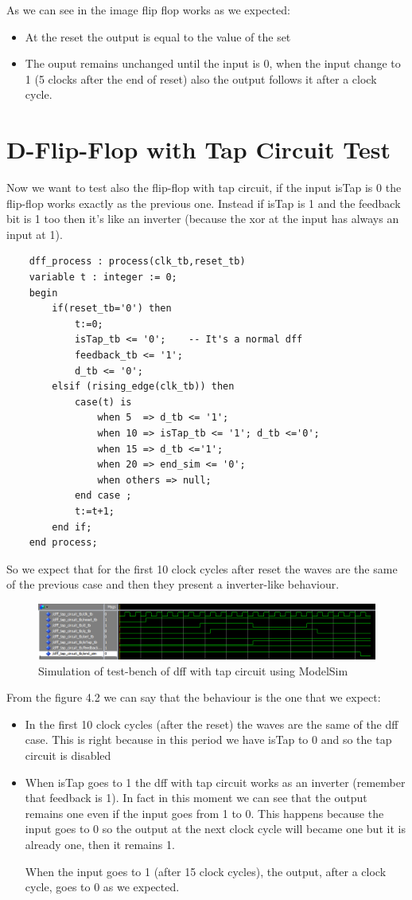 \documentclass[a4paper]{report}
\begin{document}
\noindent As we can see in the image flip flop works as we expected:
\begin{itemize}
	\item At the reset the output is equal to the value of the set
	\item The ouput remains unchanged until the input is 0, when the input change to 1 (5 clocks after the end of reset) also the output follows it after a clock cycle.
\end{itemize}

\section{D-Flip-Flop with Tap Circuit Test}
Now we want to test also the flip-flop with tap circuit, if the input isTap is 0 the flip-flop works exactly as the previous one. Instead if isTap is 1 and the feedback bit is 1 too then it's like an inverter (because the xor at the input has always an input at 1).
\begin{lstlisting}
	dff_process : process(clk_tb,reset_tb)
	variable t : integer := 0;
	begin
		if(reset_tb='0') then
			t:=0;
			isTap_tb <= '0'; 	-- It's a normal dff
			feedback_tb <= '1';
			d_tb <= '0';
		elsif (rising_edge(clk_tb)) then
			case(t) is
				when 5  => d_tb <= '1';		
				when 10 => isTap_tb <= '1'; d_tb <='0';	
				when 15 => d_tb <='1';	
				when 20 => end_sim <= '0';
				when others => null;	
			end case ;
			t:=t+1;
		end if;
	end process;
\end{lstlisting}
So we expect that for the first 10 clock cycles after reset the waves are the same of the previous case and then they present a inverter-like behaviour.
\begin{figure}[htpb]
	\centering
	\includegraphics[width=.6\textheight, height=.125\textheight]{img/tb/wave_dff_tap_circuit_test.png}
	\caption{Simulation of test-bench of dff with tap circuit using ModelSim}
\end{figure}

\noindent From the figure 4.2 we can say that the behaviour is the one that we expect:
\begin{itemize}
	\item In the first 10 clock cycles (after the reset) the waves are the same of the dff case. This is right because in this period we have isTap to 0 and so the tap circuit is disabled
	\item When isTap goes to 1 the dff with tap circuit works as an inverter (remember that feedback is 1). In fact in this moment we can see that the output remains one even if the input goes from 1 to 0. This happens because the input goes to 0 so the output at the next clock cycle will became one but it is already one, then it remains 1.
	
	\noindent When the input goes to 1 (after 15 clock cycles), the output, after a clock cycle, goes to 0 as we expected. 
\end{itemize}
\end{document}
